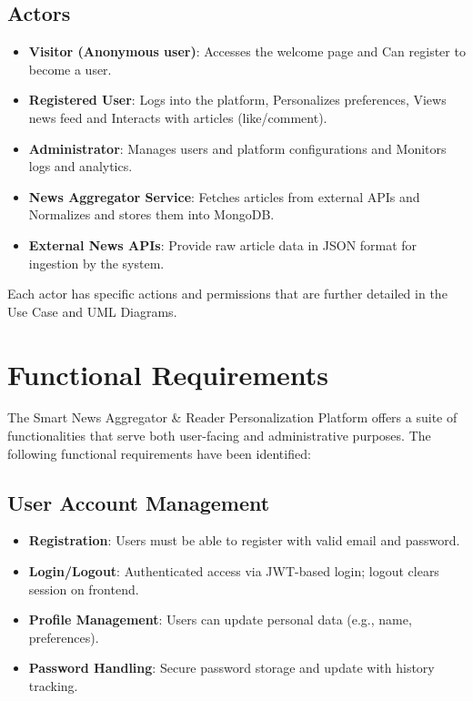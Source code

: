 \subsection{Actors}\label{subsec:actors}

\begin{itemize}
    \item \textbf{Visitor (Anonymous user)}: Accesses the welcome page and Can register to become a user.
    \item \textbf{Registered User}: Logs into the platform, Personalizes preferences, Views news feed and Interacts with articles (like/comment).
    \item \textbf{Administrator}: Manages users and platform configurations and Monitors logs and analytics.
    \item \textbf{News Aggregator Service}: Fetches articles from external APIs and Normalizes and stores them into MongoDB.
    \item \textbf{External News APIs}: Provide raw article data in JSON format for ingestion by the system.
\end{itemize}

Each actor has specific actions and permissions that are further detailed in the Use Case and UML Diagrams.


\section{Functional Requirements}\label{sec:functional-requirments}

The Smart News Aggregator \& Reader Personalization Platform offers a suite of functionalities that serve both user-facing and administrative purposes.
The following functional requirements have been identified:

\subsection{User Account Management}\label{subsec:user-account-management}

\begin{itemize}
    \item \textbf{Registration}: Users must be able to register with valid email and password.
    \item \textbf{Login/Logout}: Authenticated access via JWT-based login; logout clears session on frontend.
    \item \textbf{Profile Management}: Users can update personal data (e.g., name, preferences).
    \item \textbf{Password Handling}: Secure password storage and update with history tracking.
\end{itemize}

